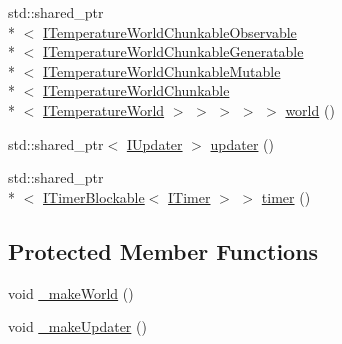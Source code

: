 \begin{DoxyCompactItemize}
\item 
std\-::shared\-\_\-ptr\\*
$<$ \hyperlink{class_i_temperature_world_chunkable_observable}{I\-Temperature\-World\-Chunkable\-Observable}\\*
$<$ \hyperlink{class_i_temperature_world_chunkable_generatable}{I\-Temperature\-World\-Chunkable\-Generatable}\\*
$<$ \hyperlink{class_i_temperature_world_chunkable_mutable}{I\-Temperature\-World\-Chunkable\-Mutable}\\*
$<$ \hyperlink{class_i_temperature_world_chunkable}{I\-Temperature\-World\-Chunkable}\\*
$<$ \hyperlink{class_i_temperature_world}{I\-Temperature\-World} $>$ $>$ $>$ $>$ $>$ \hyperlink{class_scaling_generatable_chunked_temperature_world_injector_a370a3290c83d357760662b5c63183d5b}{world} ()
\item 
std\-::shared\-\_\-ptr$<$ \hyperlink{class_i_updater}{I\-Updater} $>$ \hyperlink{class_scaling_generatable_chunked_temperature_world_injector_a75cd417c40bef43ead32acd6b4527770}{updater} ()
\item 
std\-::shared\-\_\-ptr\\*
$<$ \hyperlink{class_i_timer_blockable}{I\-Timer\-Blockable}$<$ \hyperlink{class_i_timer}{I\-Timer} $>$ $>$ \hyperlink{class_scaling_generatable_chunked_temperature_world_injector_a9ad4c32579a542181f67aedc8bd664e2}{timer} ()
\end{DoxyCompactItemize}
\subsection*{Protected Member Functions}
\begin{DoxyCompactItemize}
\item 
void \hyperlink{class_scaling_generatable_chunked_temperature_world_injector_ad912439ee80b88cd6e879940be8d59d1}{\-\_\-make\-World} ()
\item 
void \hyperlink{class_scaling_generatable_chunked_temperature_world_injector_afb89e6cd1af2754864ff17f2b21f1e97}{\-\_\-make\-Updater} ()
\end{DoxyCompactItemize}
